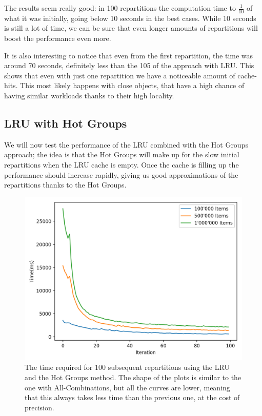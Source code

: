 The results seem really good: in 100 repartitions the computation time to $\frac{1}{10}$ of what it was initially, going below 10 seconds in the best cases. While 10 seconds is still a lot of time, we can be sure that even longer amounts of repartitions will boost the performance even more. 

It is also interesting to notice that even from the first repartition, the time was around 70 seconds, definitely less than the 105 of the approach with LRU. This shows that even with just one repartition we have a noticeable amount of cache-hits. This most likely happens with close objects, that have a high chance of having similar workloads thanks to their high locality.

\newpage
\subsection{LRU with Hot Groups}\label{sec:lru-hot-groups}
We will now test the performance of the LRU combined with the Hot Groups approach; the idea is that the Hot Groups will make up for the slow initial repartitions when the LRU cache is empty. Once the cache is filling up the performance should increase rapidly, giving us good approximations of the repartitions thanks to the Hot Groups. 

\begin{figure}[!htb]
  \centering
  \includegraphics[width=\textwidth,height=\textheight,keepaspectratio]{img/LRU_8_hot.png}
  \caption[caption]{The time required for 100 subsequent repartitions using the LRU and the Hot Groups method. The shape of the plots is similar to the one with All-Combinations, but all the curves are lower, meaning that this always takes less time than the previous one, at the cost of precision.}
  \label{fig:LRU_8_hot}
\end{figure}


